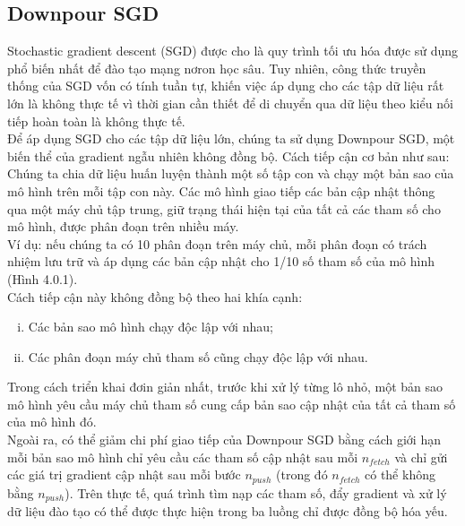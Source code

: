 \documentclass[11pt,a4paper]{article}
\numberwithin{equation}{subsection}
\numberwithin{figure}{subsection}
\numberwithin{table}{subsection}
\begin{document}
\subsection{Downpour SGD}
Stochastic gradient descent (SGD) được cho là quy trình tối ưu hóa được sử dụng phổ biến nhất để đào tạo mạng nơron học sâu. Tuy nhiên, công thức truyền thống của SGD vốn có tính tuần tự, khiến việc áp dụng cho các tập dữ liệu rất lớn là không thực tế vì thời gian cần thiết để di chuyển qua dữ liệu theo kiểu nối tiếp hoàn toàn là không thực tế.\\

Để áp dụng SGD cho các tập dữ liệu lớn, chúng ta sử dụng Downpour SGD, một biến thể của gradient ngẫu nhiên không đồng bộ. Cách tiếp cận cơ bản như sau: Chúng ta chia dữ liệu huấn luyện thành một số tập con và chạy một bản sao của mô hình trên mỗi tập con này. Các mô hình giao tiếp các bản cập nhật thông qua một máy chủ tập trung, giữ trạng thái hiện tại của tất cả các tham số cho mô hình, được phân đoạn trên nhiều máy.\\
Ví dụ: nếu chúng ta có 10 phân đoạn trên máy chủ, mỗi phân đoạn có trách nhiệm lưu trữ và áp dụng các bản cập nhật cho 1/10 số tham số của mô hình (Hình 4.0.1).\\

Cách tiếp cận này không đồng bộ theo hai khía cạnh:
\begin{enumerate}[i.]
	\item Các bản sao mô hình chạy độc lập với nhau;
	\item Các phân đoạn máy chủ tham số cũng chạy độc lập với nhau.
\end{enumerate}

Trong cách triển khai đơin giản nhất, trước khi xử lý từng lô nhỏ, một bản sao mô hình yêu cầu máy chủ tham số cung cấp bản sao cập nhật của tất cả tham số của mô hình đó.\\

Ngoài ra, có thể giảm chi phí giao tiếp của Downpour SGD bằng cách giới hạn mỗi bản sao mô hình chỉ yêu cầu các tham số cập nhật sau mỗi $n_{fetch}$ và chỉ gửi các giá trị gradient cập nhật sau mỗi bước $n_{push}$ (trong đó $n_{fetch}$ có thể không bằng $n_{push}$). Trên thực tế, quá trình tìm nạp các tham số, đẩy gradient và xử lý dữ liệu đào tạo có thể được thực hiện trong ba luồng chỉ được đồng bộ hóa yếu.\\
\end{document}
